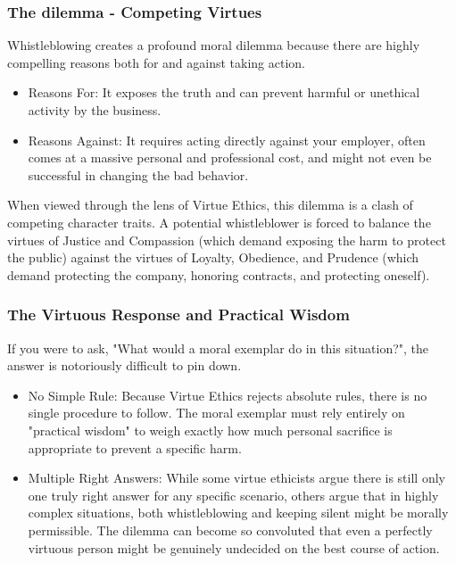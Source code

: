 \documentclass[12pt]{article}
\begin{document}
\subsubsection{The dilemma - Competing Virtues}
Whistleblowing creates a profound moral dilemma because there are highly compelling reasons both for and against taking action.
\begin{itemize}
    \item Reasons For: It exposes the truth and can prevent harmful or unethical activity by the business.
    \item Reasons Against: It requires acting directly against your employer, often comes at a massive personal and professional cost, and might not even be successful in changing the bad behavior.
\end{itemize}
When viewed through the lens of Virtue Ethics, this dilemma is a clash of competing character traits. A potential whistleblower is forced to balance the virtues of Justice and Compassion (which demand exposing the harm to protect the public) against the virtues of Loyalty, Obedience, and Prudence (which demand protecting the company, honoring contracts, and protecting oneself).
\subsubsection{The Virtuous Response and Practical Wisdom}
If you were to ask, "What would a moral exemplar do in this situation?", the answer is notoriously difficult to pin down.
\begin{itemize}
    \item No Simple Rule: Because Virtue Ethics rejects absolute rules, there is no single procedure to follow. The moral exemplar must rely entirely on "practical wisdom" to weigh exactly how much personal sacrifice is appropriate to prevent a specific harm.
    \item Multiple Right Answers: While some virtue ethicists argue there is still only one truly right answer for any specific scenario, others argue that in highly complex situations, both whistleblowing and keeping silent might be morally permissible. The dilemma can become so convoluted that even a perfectly virtuous person might be genuinely undecided on the best course of action.
\end{itemize}
\end{document}
